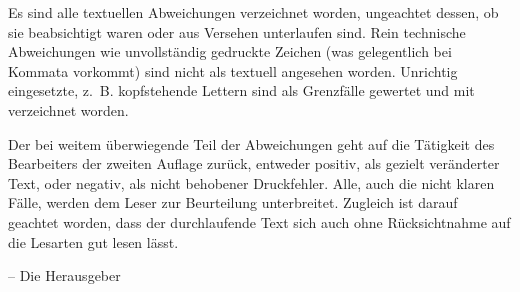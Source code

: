 Es sind alle textuellen Abweichungen verzeichnet worden, ungeachtet dessen, ob sie beabsichtigt waren oder aus Versehen unterlaufen sind. Rein technische Abweichungen wie unvollständig gedruckte Zeichen (was gelegentlich bei Kommata vorkommt) sind nicht als textuell angesehen worden. Unrichtig eingesetzte, z.~B. kopf­stehende Lettern sind als Grenzfälle gewertet und mit verzeichnet worden.

Der bei weitem überwiegende Teil der Abweichungen geht auf die Tätigkeit des Bearbeiters der zweiten Auflage zurück, entweder positiv, als gezielt veränderter Text, oder negativ, als nicht behobe­ner Druckfehler. Alle, auch die nicht klaren Fälle, werden dem Leser zur Beurteilung unterbreitet. Zugleich ist darauf geachtet worden, dass der durchlaufende Text sich auch ohne Rücksichtnahme auf die Lesarten gut lesen lässt.

\begin{flushright}
-- Die Herausgeber
\end{flushright}